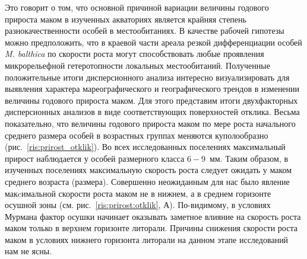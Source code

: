 Это говорит о том, что основной причиной вариации величины годового прироста маком в изученных акваториях является крайняя степень разнокачественности особей в местообитаниях. 
В качестве рабочей гипотезы можно предположить, что в краевой части ареала резкой дифференциации особей {\it M. balthica} по скорости роста могут способствовать любые проявления микрорельефной гетеротопности локальных местообитаний.
Полученные положительные итоги дисперсионного анализа интересно визуализировать для выявления характера мареографического и географического трендов в изменении величины годового прироста маком. 
Для этого представим итоги двухфакторных дисперсионных анализов в виде соответствующих поверхностей отклика.
Весьма показательно, что величины годового прироста маком по мере роста начального среднего размера особей в возрастных группах меняются куполообразно (рис.~\ref{ris:prirost_otklik}). 
Во всех исследованных поселениях максимальный прирост наблюдается у особей размерного класса $6 - 9$~мм. 
Таким образом, в изученных поселениях максимальную скорость роста следует ожидать у маком среднего возраста (размера). 
Совершенно неожиданным для нас было явление макcимальной скорости роста маком не в нижнем, а в среднем горизонте осушной зоны (см. рис.~\ref{ris:prirost:otklik}, А). 
По-видимому, в условиях Мурмана фактор осушки начинает оказывать заметное влияние на скорость роста маком только в верхнем горизонте литорали. 
Причины снижения скорости роста маком в условиях нижнего горизонта литорали на данном этапе исследований нам не ясны.
